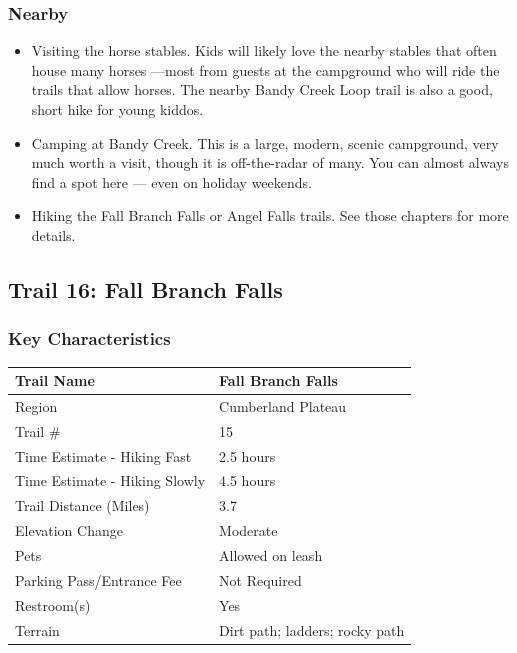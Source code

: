 \documentclass[
  letterpaper,
  DIV=11,
  numbers=noendperiod]{scrartcl}
\providecommand{\tightlist}{%
  \setlength{\itemsep}{0pt}\setlength{\parskip}{0pt}}\usepackage{longtable,booktabs,array}
\begin{document}
\hypertarget{nearby-14}{%
\subsubsection{Nearby}\label{nearby-14}}

\begin{itemize}
\tightlist
\item
  Visiting the horse stables. Kids will likely love the nearby stables
  that often house many horses ---most from guests at the campground who
  will ride the trails that allow horses. The nearby Bandy Creek Loop
  trail is also a good, short hike for young kiddos.
\item
  Camping at Bandy Creek. This is a large, modern, scenic campground,
  very much worth a visit, though it is off-the-radar of many. You can
  almost always find a spot here --- even on holiday weekends.
\item
  Hiking the Fall Branch Falls or Angel Falls trails. See those chapters
  for more details.
\end{itemize}

\hypertarget{trail-16-fall-branch-falls}{%
\subsection{Trail 16: Fall Branch
Falls}\label{trail-16-fall-branch-falls}}

\hypertarget{key-characteristics-15}{%
\subsubsection{Key Characteristics}\label{key-characteristics-15}}

\begin{longtable}[]{@{}ll@{}}
\toprule\noalign{}
Trail Name & Fall Branch Falls \\
\midrule\noalign{}
\endhead
\bottomrule\noalign{}
\endlastfoot
Region & Cumberland Plateau \\
Trail \# & 15 \\
Time Estimate - Hiking Fast & 2.5 hours \\
Time Estimate - Hiking Slowly & 4.5 hours \\
Trail Distance (Miles) & 3.7 \\
Elevation Change & Moderate \\
Pets & Allowed on leash \\
Parking Pass/Entrance Fee & Not Required \\
Restroom(s) & Yes \\
Terrain & Dirt path; ladders; rocky path \\
\end{longtable}
\end{document}
